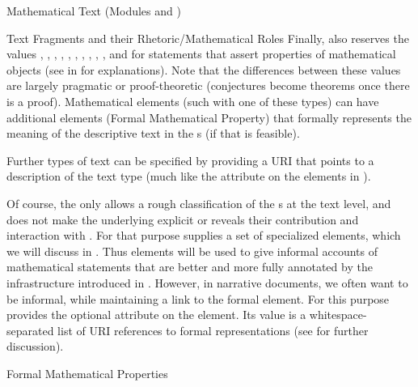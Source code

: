 \begin{tchapter}[id=mtxt,short=Mathematical Text]{Mathematical Text (Modules
   and )}
\begin{tsection}[id=omtext]{Text Fragments and their Rhetoric/Mathematical Roles}
Finally, \omdoc also reserves the values ,
, ,
, ,
, ,
, ,
,  and
 for statements that assert properties of mathematical
objects (see  in  for
explanations). Note that the differences between these values are largely pragmatic or
proof-theoretic (conjectures become theorems once there is a proof).  Mathematical
 elements (such with one of these types) can have additional
 elements (Formal Mathematical Property) that formally represents the
meaning of the descriptive text in the s (if that is feasible).

Further types of text can be specified by providing a URI that points to a description of
the text type (much like the  attribute on
the  elements in {\cmathml}).

Of course, the  only allows a rough classification of the
{s} at the text level, and does not make the underlying
 explicit or reveals their contribution and interaction with
.  For that purpose \omdoc supplies a set of
specialized elements, which we will discuss in .  Thus
 elements will be used to give informal accounts of mathematical
statements that are better and more fully annotated by the infrastructure introduced in
. However, in narrative documents, we often want to be informal,
while maintaining a link to the formal element. For this purpose \omdoc provides the
optional  attribute on the  element. Its
value is a whitespace-separated list of URI references to formal representations (see
 for further discussion).
\end{tsection}

\begin{tsection}[id=FMP]{Formal Mathematical Properties}
  

\end{tsection}
\end{tchapter}
